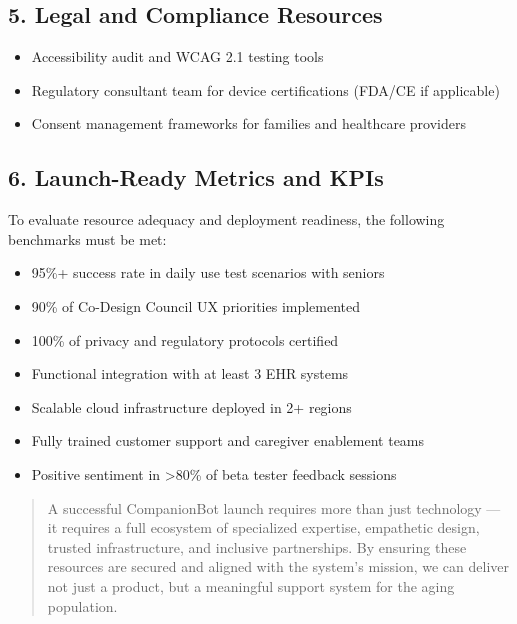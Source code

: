 \documentclass[
  letterpaper,
  DIV=11,
  numbers=noendperiod]{scrartcl}
\providecommand{\tightlist}{%
  \setlength{\itemsep}{0pt}\setlength{\parskip}{0pt}}\usepackage{longtable,booktabs,array}
\begin{document}
\subsection{5. Legal and Compliance
Resources}\label{legal-and-compliance-resources}

\begin{itemize}
\tightlist
\item
  Accessibility audit and WCAG 2.1 testing tools
\item
  Regulatory consultant team for device certifications (FDA/CE if
  applicable)
\item
  Consent management frameworks for families and healthcare providers
\end{itemize}

\subsection{6. Launch-Ready Metrics and
KPIs}\label{launch-ready-metrics-and-kpis}

To evaluate resource adequacy and deployment readiness, the following
benchmarks must be met:

\begin{itemize}
\tightlist
\item
  95\%+ success rate in daily use test scenarios with seniors
\item
  90\% of Co-Design Council UX priorities implemented
\item
  100\% of privacy and regulatory protocols certified
\item
  Functional integration with at least 3 EHR systems
\item
  Scalable cloud infrastructure deployed in 2+ regions
\item
  Fully trained customer support and caregiver enablement teams
\item
  Positive sentiment in \textgreater80\% of beta tester feedback
  sessions
\end{itemize}

\begin{quote}
A successful CompanionBot launch requires more than just technology ---
it requires a full ecosystem of specialized expertise, empathetic
design, trusted infrastructure, and inclusive partnerships. By ensuring
these resources are secured and aligned with the system's mission, we
can deliver not just a product, but a meaningful support system for the
aging population.
\end{quote}
\end{document}
